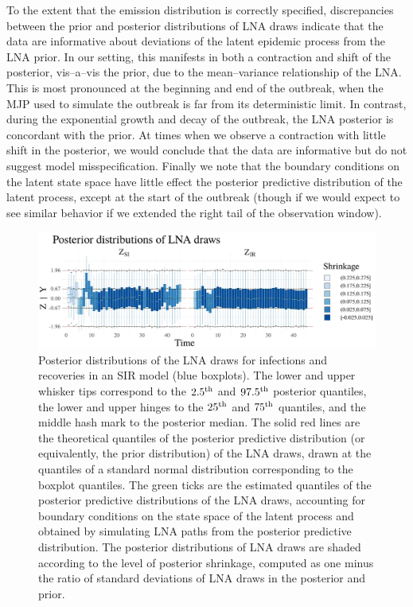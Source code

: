 To the extent that the emission distribution is correctly specified, discrepancies between the prior and posterior distributions of LNA draws indicate that the data are informative about deviations of the latent epidemic process from the LNA prior. In our setting, this manifests in both a contraction and shift of the posterior, vis--a--vis the prior, due to the mean--variance relationship of the LNA. This is most pronounced at the beginning and end of the outbreak, when the MJP used to simulate the outbreak is far from its deterministic limit. In contrast, during the exponential growth and decay of the outbreak, the LNA posterior is concordant with the prior. At times when we observe a contraction with little shift in the posterior, we would conclude that the data are informative but do not suggest model misspecification. Finally we note that the boundary conditions on the latent state space have little effect the posterior predictive distribution of the latent process, except at the start of the outbreak (though if we would expect to see similar behavior if we extended the right tail of the observation window). 


\begin{figure}[htbp]
	\centering
	\includegraphics[width=\linewidth]{figures/sir_drawplots}
	\caption[Posterior distributions of LNA draws for an SIR model.]{Posterior distributions of the LNA draws for infections and recoveries in an SIR model (blue boxplots). The lower and upper whisker tips correspond to the $ 2.5^{\mathrm{th}} $ and $ 97.5^{\mathrm{th}} $ posterior quantiles, the lower and upper hinges to the $ 25^{\mathrm{th}} $ and $ 75^{\mathrm{th}} $ quantiles, and the middle hash mark to the posterior median. The solid red lines are the theoretical quantiles of the posterior predictive distribution (or equivalently, the prior distribution) of the LNA draws, drawn at the quantiles of a standard normal distribution corresponding to the boxplot quantiles. The green ticks are the estimated quantiles of the posterior predictive distributions of the LNA draws, accounting for boundary conditions on the state space of the latent process and obtained by simulating LNA paths from the posterior predictive distribution. The posterior distributions of LNA draws are shaded according to the level of posterior shrinkage, computed as one minus the ratio of standard deviations of LNA draws in the posterior and prior.}
	\label{fig:sir_drawplots}
\end{figure}

